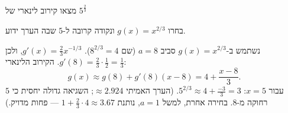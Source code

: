 
\begin{question}
מצאו קירוב לינארי של $5^{\frac{2}{3}}$
\end{question}

\begin{hint}
בחרו $g(x)=x^{2/3}$ ונקודה קרובה ל-$5$ שבה הערך ידוע.
\end{hint}

\begin{solution}
נשתמש ב-$g(x)=x^{2/3}$ סביב $a=8$ (שם $8^{2/3}=4$). $g'(x)=\frac23x^{-1/3}$, ולכן $g'(8)=\frac23\cdot\frac12=\frac13$. הקירוב הלינארי:
\[ g(x)\approx g(8)+g'(8)(x-8)=4+\frac{x-8}{3}. \]
עבור $x=5$: $5^{2/3}\approx4+\frac{-3}{3}=\boxed{3}$.
(הערך האמיתי $\approx2.924$; השגיאה גדולה יחסית כי $5$ רחוקה מ-$8$. בחירה אחרת, למשל $a=1$, נותנת $1+\frac23\cdot4\approx3.67$ — פחות מדויק.)
\end{solution}
